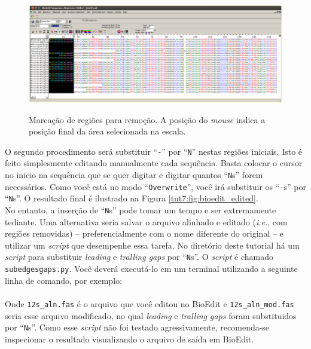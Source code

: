\begin{refsection}
  \begin{figure}[H]
       \centering
      {\includegraphics[scale=0.3]{figures/tut7/bioedit_mark.eps}}
	{\caption[Bioedit: marcando regiões de edição]{Marcação de regiões para remoção. A posição do \textit{mouse} indica a posição final da área selecionada na escala.}\label{tut7:fig:bioedit_mark}}
  \end{figure}


O segundo procedimento será substituir ``\texttt{-}'' por ``\texttt{N}'' nestas regiões iniciais. Isto é feito simplesmente editando manualmente cada sequência. Basta colocar o cursor no inicio na sequência que se quer digitar e digitar quantos ``\texttt{N}s'' forem necessários. Como você está no modo ``\texttt{Overwrite}'', você irá substituir os ``\texttt{-}s'' por ``\texttt{N}s''. O resultado final é ilustrado na Figura \ref{tut7:fig:bioedit_edited}.\\

No entanto, a inserção de ``\texttt{N}s'' pode tomar um tempo e ser extremamente tediante. Uma alternativa seria salvar o arquivo alinhado e editado (\textit{i.e.}, com regiões removidas) -- preferencialmente com o nome diferente do original -- e utilizar um \textit{script} que desempenhe essa tarefa. No diretório deste tutorial há um \textit{script} para substituir \textit{leading} e \textit{tralling gaps} por ``\texttt{N}s''. O \textit{script} é chamado \texttt{subedgesgaps.py}. Você deverá executá-lo  em um terminal utilizando a seguinte linha de comando, por exemplo:\\

\\

Onde \texttt{12s\_aln.fas} é o arquivo que você editou no BioEdit e \texttt{12s\_aln\_mod.fas} seria esse arquivo modificado, no qual \textit{leading} e \textit{tralling gaps} foram substituidos por ``\texttt{N}s''. Como esse \textit{script} não foi testado agressivamente, recomenda-se inspecionar o resultado visualizando o arquivo de saída em BioEdit.



\end{refsection}
